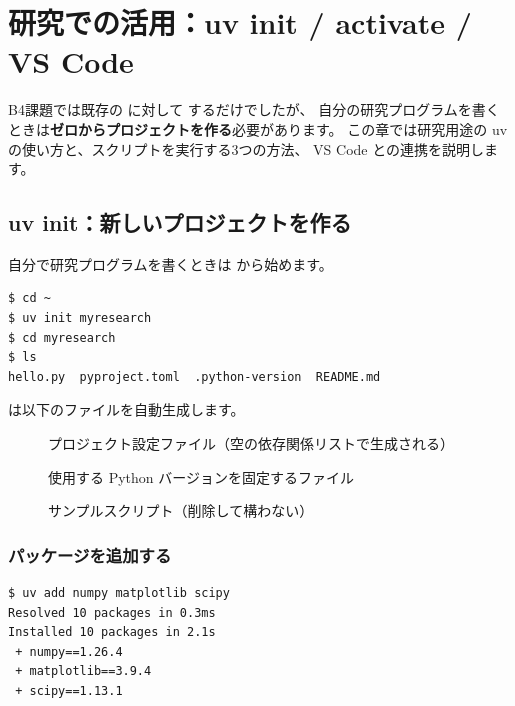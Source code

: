 \chapter{研究での活用：uv init / activate / VS Code}

B4課題では既存の  に対して  するだけでしたが、
自分の研究プログラムを書くときは\textbf{ゼロからプロジェクトを作る}必要があります。
この章では研究用途の uv の使い方と、スクリプトを実行する3つの方法、
VS Code との連携を説明します。

\section{uv init：新しいプロジェクトを作る}

自分で研究プログラムを書くときは  から始めます。

\begin{wslbox}[新規プロジェクトの作成]
\begin{lstlisting}[style=bash]
$ cd ~
$ uv init myresearch
$ cd myresearch
$ ls
hello.py  pyproject.toml  .python-version  README.md
\end{lstlisting}
\end{wslbox}

 は以下のファイルを自動生成します。

\begin{description}
  \item[]
    プロジェクト設定ファイル（空の依存関係リストで生成される）
  \item[]
    使用する Python バージョンを固定するファイル
  \item[]
    サンプルスクリプト（削除して構わない）
\end{description}

\subsection{パッケージを追加する}

\begin{wslbox}[必要なパッケージを追加]
\begin{lstlisting}[style=bash]
$ uv add numpy matplotlib scipy
Resolved 10 packages in 0.3ms
Installed 10 packages in 2.1s
 + numpy==1.26.4
 + matplotlib==3.9.4
 + scipy==1.13.1
\end{lstlisting}
\end{wslbox}

